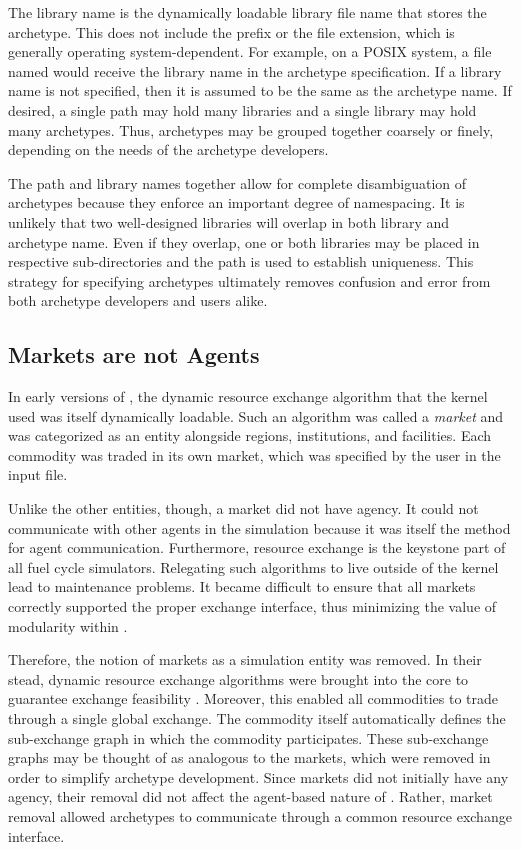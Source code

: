 The library name is the dynamically loadable library file name that stores the 
archetype. This does not include the  prefix or the file extension, 
which is generally operating system-dependent.  For example, on a
POSIX system,
a file named  would receive the library name 
in the archetype specification. 
If a library name is not specified, then it is assumed to be the same as the 
archetype name.
If desired, a single path may hold many libraries and a single library may hold
many archetypes. Thus, archetypes may be grouped
together coarsely or finely, depending on the needs of the archetype developers.

The path and library names together allow for complete disambiguation of 
archetypes because they enforce an important degree of namespacing.  It is unlikely
that two well-designed libraries will overlap in both library and archetype name.
Even if they overlap, one or both libraries may be placed in respective
sub-directories and the path is used to establish uniqueness.
This strategy for specifying archetypes ultimately removes confusion and error from 
both archetype developers and users alike.

\subsection{Markets are not Agents}

In early versions of \cyclus, the dynamic resource exchange algorithm that the 
kernel used was itself dynamically loadable. Such an algorithm was called a
\emph{market} and was categorized as an entity alongside regions,
institutions, and facilities. 
Each commodity was traded in its own market, which was specified by 
the user in the input file.

Unlike the other entities, though, a market did not have agency.  It could not 
communicate with other agents in the simulation because it was itself the method
for agent communication.  Furthermore, resource exchange is the keystone
part of all fuel cycle simulators. 
Relegating such algorithms to live outside of 
the kernel lead to maintenance problems. It became difficult to 
ensure that all markets correctly supported the proper exchange interface,
thus minimizing the value of modularity within \cyclus.

Therefore, the notion of markets as a simulation entity was removed. In their 
stead, dynamic resource exchange algorithms were brought into the core to
guarantee exchange feasibility \cite{Gidden2016}. Moreover, this enabled all commodities to trade 
through a single global exchange. The commodity itself automatically defines 
the sub-exchange graph in which the commodity participates.
These sub-exchange graphs may be thought of as analogous to the 
markets, which were removed in order to simplify archetype development.
Since markets did not initially have any agency, their removal did not 
affect the agent-based
nature of \cyclus.  Rather, market removal allowed archetypes to 
communicate through a common resource exchange interface.

